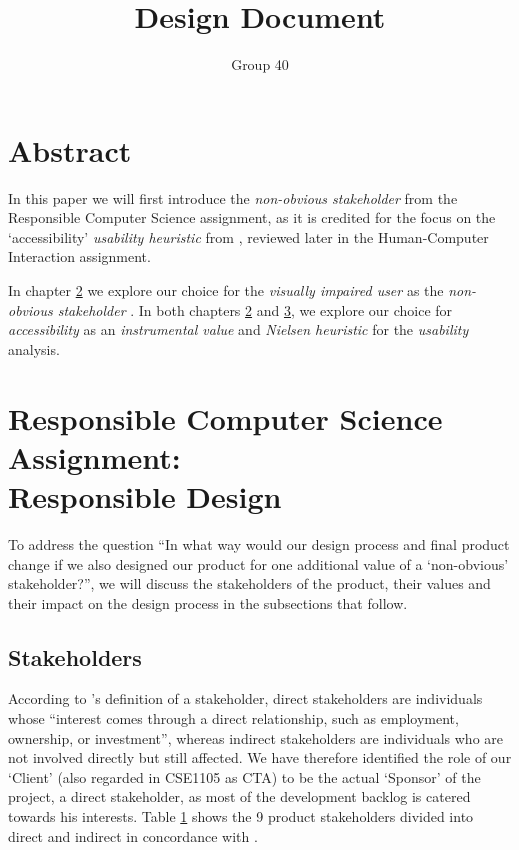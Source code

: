 \documentclass{article}
\author{Group 40}
\title{Design Document}
\begin{document}
\maketitle

\section{Abstract}

In this paper we will first introduce the \emph{non-obvious stakeholder} from the
Responsible Computer Science assignment, as it is credited for the focus on the `accessibility'
\emph{usability heuristic} from \textcite{Nielsen1994},
reviewed later in the Human-Computer Interaction assignment.

In chapter \hyperref[ethics]{2} we explore our choice for the \emph{visually impaired user} as the \emph{non-obvious stakeholder}
. In both chapters  \hyperref[ethics]{2} and  \hyperref[hci]{3}, we explore our choice for \emph{accessibility} as an
\emph{instrumental value} and  \emph{Nielsen heuristic} for the \emph{usability} analysis. \parencite{Nielsen1994}

    
\section{Responsible Computer Science Assignment:\\Responsible Design\label{ethics}}

To address the question ``In what way would our design process and final product change if we
also designed our product for one additional value of a ‘non-obvious’ stakeholder?'', we will discuss the stakeholders of the product, their values and their impact on the design process in the subsections that follow.

\subsection{Stakeholders\label{stakeholders}}

According to \textcite{Investopedia-stakeholder}'s definition of a stakeholder, direct stakeholders are individuals whose ``interest comes through a direct relationship,
such as employment, ownership, or investment'', whereas indirect stakeholders are individuals who
are not involved directly but still affected. We have therefore identified the role of our `Client' (also regarded in CSE1105 as CTA)
to be the actual `Sponsor' of the project, a direct stakeholder, as most of the development backlog is
catered towards his interests. Table \hyperref[stakeholdersTable]{1} shows the 9 product stakeholders divided into direct and indirect in concordance with
\textcite{Investopedia-stakeholder}.
\end{document}
